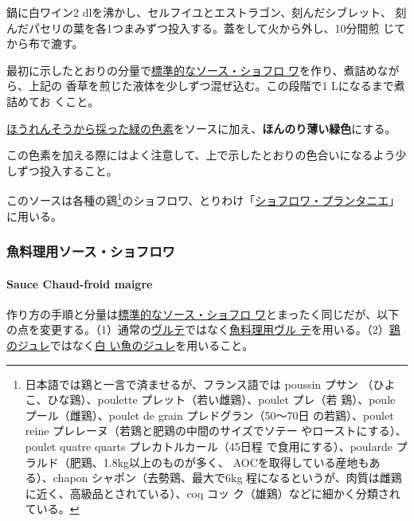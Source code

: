 \begin{recette}
鍋に白ワイン2 dlを沸かし、セルフイユとエストラゴン、刻んだシブレット、
刻んだパセリの葉を各1つまみずつ投入する。蓋をして火から外し、10分間煎
じてから布で漉す。

最初に示したとおりの分量で\protect\hyperlink{sauce-chaud-froid-blanche-ordinaire}{標準的なソース・ショフロ
ワ}を作り、煮詰めながら、上記の
香草を煎じた液体を少しずつ混ぜ込む。この段階で1 Lになるまで煮詰めてお
くこと。

\protect\hyperlink{}{ほうれんそうから採った緑の色素}をソースに加え、\textbf{ほんのり薄い緑色}にする。

この色素を加える際にはよく注意して、上で示したとおりの色合いになるよう少しずつ投入すること。

このソースは各種の鶏\footnote{日本語では鶏と一言で済ませるが、フランス語では
  poussin プサン （ひよこ、ひな鶏）、poulette
  プレット（若い雌鶏）、poulet プレ（若 鶏）、poule
  プール（雌鶏）、poulet de grain プレドグラン（50〜70日
  の若鶏）、poulet reine プレレーヌ（若鶏と肥鶏の中間のサイズでソテー
  やローストにする）、poulet quatre quarts プレカトルカール（45日程
  で食用にする）、poularde プラルド（肥鶏、1.8kg以上のものが多く、
  AOCを取得している産地もある）、chapon シャポン（去勢鶏、最大で6kg
  程になるというが、肉質は雌鶏に近く、高級品とされている）、coq コッ
  ク（雄鶏）などに細かく分類されている。}のショフロワ、とりわけ「\protect\hyperlink{}{ショフロワ・プランタニエ}」に用いる。

\maeaki

\hypertarget{ux9b5aux6599ux7406ux7528ux30bdux30fcux30b9ux30b7ux30e7ux30d5ux30edux30ef}{%
\subsubsection{魚料理用ソース・ショフロワ}\label{ux9b5aux6599ux7406ux7528ux30bdux30fcux30b9ux30b7ux30e7ux30d5ux30edux30ef}}

\hypertarget{sauce-chaud-froid-maigre}{%
\paragraph{Sauce Chaud-froid maigre}\label{sauce-chaud-froid-maigre}}

作り方の手順と分量は\protect\hyperlink{sauce-chaud-froid-blanche-ordinaire}{標準的なソース・ショフロ
ワ}とまったく同じだが、以下
の点を変更する。（1）通常の\protect\hyperlink{veloute}{ヴルテ}ではなく\protect\hyperlink{veloute-de-poisson}{魚料理用ヴル
テ}を用いる。（2）\protect\hyperlink{}{鶏のジュレ}ではなく\protect\hyperlink{}{白
い魚のジュレ}を用いること。


\end{recette}
